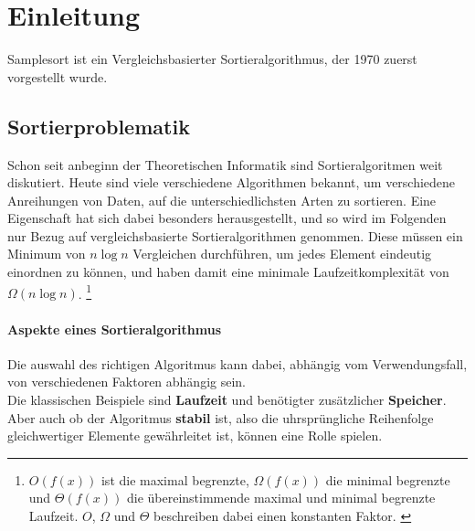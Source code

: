 \section{Einleitung}
    Samplesort ist ein Vergleichsbasierter Sortieralgorithmus, der 1970 zuerst vorgestellt wurde. \autocite{frazer-1970}
	\subsection{Sortierproblematik}
	Schon seit anbeginn der Theoretischen Informatik sind Sortieralgoritmen weit diskutiert.
	Heute sind viele verschiedene Algorithmen bekannt, um verschiedene Anreihungen von Daten, auf die unterschiedlichsten Arten zu sortieren.
	Eine Eigenschaft hat sich dabei besonders herausgestellt, und so wird im Folgenden nur Bezug auf vergleichsbasierte Sortieralgorithmen genommen.
	Diese m\"ussen ein Minimum von $n\log{n}$ Vergleichen durchführen, um jedes Element eindeutig einordnen zu k\"onnen, und haben damit eine minimale Laufzeitkomplexit\"at von $\Omega(n\log{n})$.
	\footnote{$O(f(x))$ ist die maximal begrenzte, $\Omega(f(x))$ die minimal begrenzte und $\Theta(f(x))$ die übereinstimmende maximal und minimal begrenzte Laufzeit. $O$, $\Omega$ und $\Theta$ beschreiben dabei einen konstanten Faktor. \autocite[4]{sedgewick-1996}}
	
	\paragraph{Aspekte eines Sortieralgorithmus}
	Die auswahl des richtigen Algoritmus kann dabei, abhängig vom Verwendungsfall, von verschiedenen Faktoren abhängig sein.\\
	Die klassischen Beispiele sind \textbf{Laufzeit} und benötigter zusätzlicher \textbf{Speicher}.
	Aber auch ob der Algoritmus \textbf{stabil} ist, also die uhrsprüngliche Reihenfolge gleichwertiger Elemente gewährleitet ist, können eine Rolle spielen.

